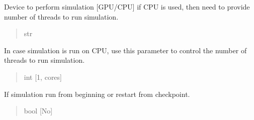 \documentclass[letterpaper,10pt,english]{sphinxmanual}
\begin{document}
\begin{fulllineitems}
\begin{fulllineitems}
\begin{quote}
\begin{description}
\end{description}\end{quote}

\end{fulllineitems}


\begin{fulllineitems}
\label{\detokenize{modules/dynamics:hps.dynamics.Dynamics.device}}
\pysigstartsignatures
{}
\pysigstopsignatures
\sphinxAtStartPar
Device to perform simulation {[}GPU/CPU{]} if CPU is used, then need to provide number of threads to run simulation.
\begin{quote}\begin{description}
\sphinxAtStartPar
str

\end{description}\end{quote}

\end{fulllineitems}


\begin{fulllineitems}
\label{\detokenize{modules/dynamics:hps.dynamics.Dynamics.ppn}}
\pysigstartsignatures
{}
\pysigstopsignatures
\sphinxAtStartPar
In case simulation is run on CPU, use this parameter to control the number of threads to run simulation.
\begin{quote}\begin{description}
\sphinxAtStartPar
int {[}1, cores{]}

\end{description}\end{quote}

\end{fulllineitems}


\begin{fulllineitems}
\label{\detokenize{modules/dynamics:hps.dynamics.Dynamics.restart}}
\pysigstartsignatures
{}
\pysigstopsignatures
\sphinxAtStartPar
If simulation run from beginning or restart from checkpoint.
\begin{quote}\begin{description}
\sphinxAtStartPar
bool {[}No{]}


\end{description}
\end{quote}
\end{fulllineitems}
\end{fulllineitems}
\end{document}
